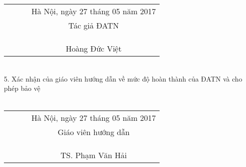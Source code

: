 \begin{acknowledgementslong}
\begin{tabular}{l l l c }
    \textbf{ } \hspace*{35pt} \textbf{ } &  \textbf{ } \hspace*{35pt} \textbf{ } & \textbf{ } \hspace*{35pt} \textbf{ } & Hà Nội, ngày 27 tháng 05 năm 2017 \\ 
    \textbf{ } \hspace*{35pt} \textbf{ } &  \textbf{ } \hspace*{35pt} \textbf{ } & \textbf{ } \hspace*{35pt} \textbf{ } & Tác giả ĐATN \\
    \\
    \\
    \\
    \textbf{ } \hspace*{35pt} \textbf{ } &  \textbf{ } \hspace*{35pt} \textbf{ } & \textbf{ } \hspace*{35pt} \textbf{ } & Hoàng Đức Việt
    \end{tabular}\\
    
5. Xác nhận của giáo viên hướng dẫn về mức độ hoàn thành của ĐATN và cho phép bảo vệ \\\\[5cm]
\begin{tabular}{l l l c }
    \textbf{ } \hspace*{35pt} \textbf{ } &  \textbf{ } \hspace*{35pt} \textbf{ } & \textbf{ } \hspace*{35pt} \textbf{ } & Hà Nội, ngày 27 tháng 05 năm 2017 \\ 
    \textbf{ } \hspace*{35pt} \textbf{ } &  \textbf{ } \hspace*{35pt} \textbf{ } & \textbf{ } \hspace*{35pt} \textbf{ } & Giáo viên hướng dẫn \\
    \\
    \\
    \\
    \textbf{ } \hspace*{35pt} \textbf{ } &  \textbf{ } \hspace*{35pt} \textbf{ } & \textbf{ } \hspace*{35pt} \textbf{ } & TS. Phạm Văn Hải
    \end{tabular}\\
    
\end{acknowledgementslong}
  